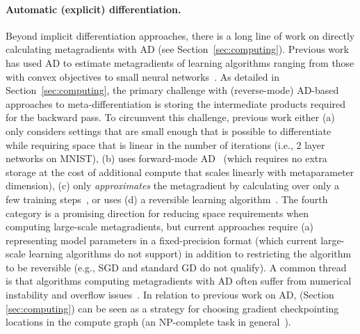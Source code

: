 \paragraph{Automatic (explicit) differentiation.} Beyond implicit
differentiation approaches, there is a long line of work on directly calculating
metagradients with AD (see Section~\ref{sec:computing}). Previous work has used
AD to estimate metagradients of learning algorithms ranging from those with
convex objectives to small neural
networks~\citep{hara2019data,maclaurin2015gradient,franceschi2017forward,micaelli2021gradient,zhang2021idarts,chandra2022gradient,scieur2022curse}.
As detailed in Section~\ref{sec:computing}, the primary challenge with
(reverse-mode) AD-based approaches to meta-differentiation is storing the
intermediate products required for the backward pass. To circumvent this
challenge, previous work either (a) only considers settings that are small
enough that is possible to differentiate while requiring space that is linear in
the number of iterations (i.e., 2 layer networks on MNIST), (b) uses
forward-mode
AD~\citep{franceschi2017forward,micaelli2021gradient,chandra2022gradient} (which
  requires no extra storage at the cost of additional compute that
  scales linearly
with metaparameter dimension), (c) only \textit{approximates} the metagradient
by calculating over only a few training
steps~\citep{liu2018darts,chen2020stabilizing,finn2017model}, or uses (d) a
reversible learning algorithm~\citep{maclaurin2015gradient}. The fourth category
is a promising direction for reducing space requirements when computing
large-scale metagradients, but current approaches require (a) representing model
parameters in a fixed-precision format (which current large-scale learning
algorithms do not support) in addition to restricting the algorithm to be
reversible (e.g., SGD and standard GD do not qualify). A common thread is that
algorithms computing metagradients with AD often suffer from numerical
instability and overflow issues~\citep{micaelli2021gradient,scieur2022curse}. In
relation to previous work on AD, \replay{} (Section \ref{sec:computing})
can be seen as a strategy for choosing gradient
checkpointing~\citep{chaitin1981register,briggs1992rematerialization,zweig2000exact,griewank2008evaluating,chen2016training}
locations in the compute graph (an NP-complete task in
general~\citep{naumann2008optimal}).

